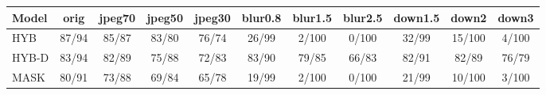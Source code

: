 \begin{tabular}{lcccccccccc}
\toprule
Model & orig & jpeg70 & jpeg50 & jpeg30 & blur0.8 & blur1.5 & blur2.5 & down1.5 & down2 & down3 \\
\midrule
HYB & 87/94 & 85/87 & 83/80 & 76/74 & 26/99 & 2/100 & 0/100 & 32/99 & 15/100 & 4/100 \\
HYB-D & 83/94 & 82/89 & 75/88 & 72/83 & 83/90 & 79/85 & 66/83 & 82/91 & 82/89 & 76/79 \\
MASK  & 80/91 & 73/88 & 69/84 & 65/78 & 19/99 & 2/100 & 0/100 & 21/99 & 10/100 & 3/100 \\
\bottomrule
\end{tabular}
